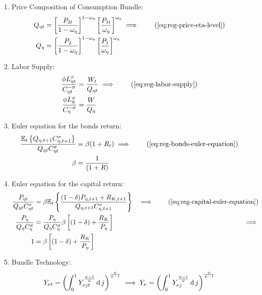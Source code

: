 \documentclass[
thesis.tex
]{subfiles}
\begin{document}
\begin{enumerate}
	\item Price Composition of Consumption Bundle:
	\begin{align}
		Q_{\eta t} &= \left[ \frac{P_{2t}}{1 -\omega_{\eta}} \right]^{1 -\omega_{\eta}} \left[ \frac{P_{1t}}{\omega_{\eta}} \right]^{\omega_{\eta}} \implies \tag{\ref{eq:reg-price-eta-level}} \\
		Q_{\eta} &= \left[ \frac{P_{2}}{1 -\omega_{\eta}} \right]^{1 -\omega_{\eta}} \left[ \frac{P_{1}}{\omega_{\eta}} \right]^{\omega_{\eta}} \label{eq:reg-ss-price-eta-level}
	\end{align}

	\item Labor Supply:
	\begin{align}
		\frac{\phi L_{\eta t}^{\varphi}}{C_{\eta t}^{-\sigma}} &= \frac{W_t}{Q_{\eta t}} \implies \tag{\ref{eq:reg-labor-supply}} \\
		\frac{\phi L_{\eta}^{\varphi}}{C_{\eta}^{-\sigma}} &= \frac{W}{Q_\eta} \label{eq:reg-ss-household-labor-supply}
	\end{align}

	\item Euler equation for the bonds return:
	\begin{align}
		\frac{ \E \left\{ Q_{\eta, t+1} C_{\eta, t+1}^{\sigma} \right\} }{ Q_{\eta t} C_{\eta t}^{\sigma} } &= \beta (1 + R_{t}) \implies  \tag{\ref{eq:reg-bonds-euler-equation}} \\
		\beta &= \frac{1}{(1 + R)} \label{eq:reg-ss-bonds-euler-equation}
	\end{align}

	\item Euler equation for the capital return:
	\begin{alignat}{2}
		\frac{ P_{\eta t} }{ Q_{\eta t} C_{\eta t}^{\sigma} }  &= \beta \mathbb{E}_t \left\{ \frac{ (1-\delta) P_{\eta, t+1} + R_{K,t+1} }{ Q_{\eta, t+1} C_{\eta, t+1}^{\sigma}} \right\} &\implies \tag{\ref{eq:reg-capital-euler-equation}} \\
		\frac{ P_{\eta} }{ Q_{\eta} C_{\eta}^{\sigma} }  &= \frac{P_{\eta}}{Q_{\eta} C_{\eta}^{\sigma}} \beta \left[ (1-\delta) + \frac{R_{K}}{P_{\eta}} \right] &\implies \nonumber \\
		1 &= \beta \left[ (1-\delta) + \frac{R_{K}}{P_{\eta}} \right] \label{eq:reg-ss-capital-euler-equation}
	\end{alignat}

	\item Bundle Technology:
	\begin{align}
		Y_{\nu t} = \left( \int_{0}^{1} Y_{\nu jt}^{\frac{\psi-1}{\psi}} \dif j \right)^{\frac{\psi}{\psi-1}} \implies %
		Y_{\nu} = \left( \int_{0}^{1} Y_{\nu j}^{\frac{\psi-1}{\psi}} \dif j \right)^{\frac{\psi}{\psi-1}} \label{eq:reg-ss-final-goods-firm-bundle-rule}
	\end{align}


\end{enumerate}
\end{document}
